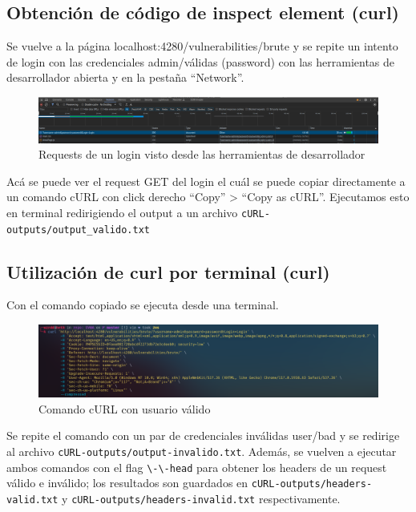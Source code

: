 \documentclass[letter,12pt]{article}
\newcommand{\code}[1]{\colorbox{lightgray!80}{\lstinline[breaklines=true]|#1|}}
\begin{document}
\subsection{Obtención de código de inspect element (curl)}
Se vuelve a la página localhost:4280/vulnerabilities/brute y se repite un
intento de login con las credenciales admin/válidas (password) con las
herramientas de desarrollador abierta y en la pestaña ``Network''.

\begin{figure}[H]
  \centering
  \includegraphics[width=16.5cm]{images/16-curl-inspect.png}
  \caption{Requests de un login visto desde las herramientas de desarrollador}
\end{figure}

Acá se puede ver el request GET del login el cuál se puede copiar directamente a
un comando cURL con click derecho ``Copy'' \-> ``Copy as cURL''. Ejecutamos esto
en terminal redirigiendo el output a un archivo \code{cURL-outputs/output_valido.txt}

\subsection{Utilización de curl por terminal (curl)}
Con el comando copiado se ejecuta desde una terminal.

\begin{figure}[H]
  \centering
  \includegraphics[width=16.5cm]{images/17-curl-command.png}
  \caption{Comando cURL con usuario válido}
\end{figure}

Se repite el comando con un par de credenciales inválidas user/bad y se redirige
al archivo \code{cURL-outputs/output-invalido.txt}. Además, se vuelven a
ejecutar ambos comandos con el flag \code{\-\-head} para obtener los headers de
un request válido e inválido; los resultados son guardados en
\code{cURL-outputs/headers-valid.txt} y \code{cURL-outputs/headers-invalid.txt} respectivamente.
\end{document}
